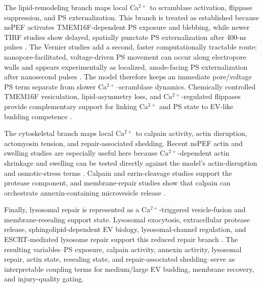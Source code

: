 \documentclass[Afour,sagev,times]{sagej}
\begin{document}
The lipid-remodeling branch maps local Ca$^{2+}$ to scramblase activation, flippase suppression, and PS externalization. This branch is treated as established because nsPEF activates TMEM16F-dependent PS exposure and blebbing, while newer TIRF studies show delayed, spatially punctate PS externalization after 400-ns pulses \cite{muratori2017activation,silkunas2026peculiarities}. The Vernier studies add a second, faster computationally tractable route: nanopore-facilitated, voltage-driven PS movement can occur along electropore walls and appears experimentally as localized, anode-facing PS externalization after nanosecond pulses \cite{vernier2006nanoporeJACS,vernier2006nanoporePhysBio}. The model therefore keeps an immediate pore/voltage PS term separate from slower Ca$^{2+}$--scramblase dynamics. Chemically controlled TMEM16F vesiculation, lipid-asymmetry loss, and Ca$^{2+}$-regulated flippases provide complementary support for linking Ca$^{2+}$ and PS state to EV-like budding competence \cite{han2019chemically,wang2025loss,segawa2016human}.

The cytoskeletal branch maps local Ca$^{2+}$ to calpain activity, actin disruption, actomyosin tension, and repair-associated shedding. Recent nsPEF actin and swelling studies are especially useful here because Ca$^{2+}$-dependent actin shrinkage and swelling can be tested directly against the model's actin-disruption and osmotic-stress terms \cite{hellwich2026extracellular,pakhomov2014disassembly,rassokhin2014cellular}. Calpain and ezrin-cleavage studies support the protease component, and membrane-repair studies show that calpain can orchestrate annexin-containing microvesicle release \cite{campbell2012structure,roberts2020ca,williams2025calpains}.

Finally, lysosomal repair is represented as a Ca$^{2+}$-triggered vesicle-fusion and membrane-resealing support state. Lysosomal exocytosis, extracellular protease release, sphingolipid-dependent EV biology, lysosomal-channel regulation, and ESCRT-mediated lysosome repair support this reduced repair branch \cite{andrews2014damage,castroGomes2016plasma,verderio2018role,rosato2021two,radulovic2018escrt}. The resulting variables--PS exposure, calpain activity, annexin activity, lysosomal repair, actin state, resealing state, and repair-associated shedding--serve as interpretable coupling terms for medium/large EV budding, membrane recovery, and injury-quality gating.
\end{document}
